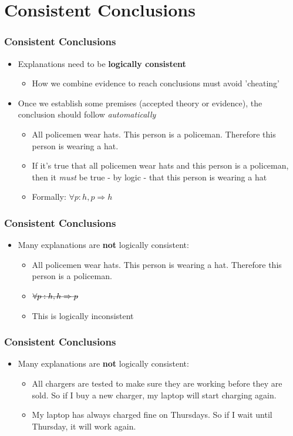 \documentclass[xcolor=x11names,compress]{beamer}\usepackage[]{graphicx}\usepackage[]{color}
\renewcommand{\(}{\begin{columns}}
\renewcommand{\)}{\end{columns}}
\newcommand{\<}[1]{\begin{column}{#1}}
\renewcommand{\>}{\end{column}}
\begin{document}
\section{Consistent Conclusions}

\begin{frame}
\frametitle{Consistent Conclusions}
\begin{itemize}
\item Explanations need to be \textbf{logically consistent}
\pause
\begin{itemize}
\item How we combine evidence to reach conclusions must avoid 'cheating'
\end{itemize}
\pause
\item Once we establish some premises (accepted theory or evidence), the conclusion should follow \textit{automatically}
\begin{itemize}
\item All policemen wear hats. This person is a policeman. Therefore this person is wearing a hat.
\pause
\item If it's true that all policemen wear hats and this person is a policeman, then it \textit{must} be true - by logic - that this person is wearing a hat
\pause
\item Formally: $\forall p:  h, p \Rightarrow h$
\end{itemize}
\end{itemize}
\end{frame}

\begin{frame}
\frametitle{Consistent Conclusions}
\begin{itemize}
\item Many explanations are \textbf{not} logically consistent:
\pause
\begin{itemize}
\item All policemen wear hats. This person is wearing a hat. Therefore this person is a policeman.
\pause
\item $\text{\sout{\ensuremath{\forall p:  h, h \Rightarrow p}}}$
\item This is logically inconsistent
\end{itemize}
\end{itemize}
\end{frame}

\begin{frame}
\frametitle{Consistent Conclusions}
\begin{itemize}
\item Many explanations are \textbf{not} logically consistent:
\pause
\begin{itemize}
\item All chargers are tested to make sure they are working before they are sold. So if I buy a new charger, my laptop will start charging again.
\pause
\item My laptop has always charged fine on Thursdays. So if I wait until Thursday, it will work again. 
\end{itemize}
\end{itemize}
\end{frame}
\end{document}
